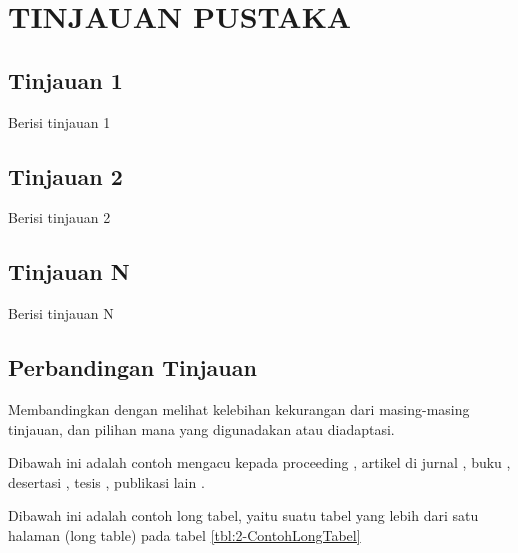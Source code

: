 

\chapter{TINJAUAN PUSTAKA}
\label{cha:2-TinjauanPustaka}

\section{Tinjauan 1 \label{sec:2-Tinjauan1}}
Berisi tinjauan 1

\section{Tinjauan 2 \label{sec:2-Tinjauan2}}
Berisi tinjauan 2

\section{Tinjauan N \label{sec:2-TinjauanN}}
Berisi tinjauan N

\section{Perbandingan Tinjauan \label{sec2-Banding}}
Membandingkan dengan melihat kelebihan kekurangan dari masing-masing tinjauan, dan pilihan mana yang digunadakan atau diadaptasi.

Dibawah ini adalah contoh mengacu kepada proceeding \cite{Ding:2005}, artikel di jurnal \cite{Bishr98}, buku \cite{Sheth:b}, desertasi \cite{Hoschek:2002}, tesis \cite{Kantere:2002}, publikasi lain \cite{Farias:a}.

Dibawah ini adalah contoh long tabel, yaitu suatu tabel yang lebih dari satu halaman (long table) pada tabel \ref{tbl:2-ContohLongTabel}


